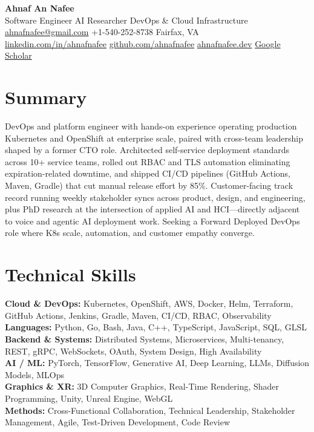 \documentclass[letterpaper,10pt]{article}
\begin{document}
\begin{center}
  {\LARGE\bfseries\color{accent} Ahnaf An Nafee }\\[3pt]
  {\normalsize Software Engineer \textbar{} AI Researcher \textbar{} DevOps \& Cloud Infrastructure }\\[4pt]
  \small
  \href{mailto:ahnafnafee@gmail.com}{ahnafnafee@gmail.com} \textbar{}
  +1-540-252-8738 \textbar{}
  Fairfax, VA\\
  \href{https://linkedin.com/in/ahnafnafee}{linkedin.com/in/ahnafnafee} \textbar{}
  \href{https://github.com/ahnafnafee}{github.com/ahnafnafee} \textbar{}
  \href{https://www.ahnafnafee.dev}{ahnafnafee.dev} \textbar{} \href{https://scholar.google.com/citations?user=u15DO0cAAAAJ}{Google Scholar}
\end{center}

\section*{Summary}
DevOps and platform engineer with hands-on experience operating production Kubernetes and OpenShift at enterprise scale, paired with cross-team leadership shaped by a former CTO role. Architected self-service deployment standards across 10+ service teams, rolled out RBAC and TLS automation eliminating expiration-related downtime, and shipped CI/CD pipelines (GitHub Actions, Maven, Gradle) that cut manual release effort by 85\%. Customer-facing track record running weekly stakeholder syncs across product, design, and engineering, plus PhD research at the intersection of applied AI and HCI---directly adjacent to voice and agentic AI deployment work. Seeking a Forward Deployed DevOps role where K8s scale, automation, and customer empathy converge.

\section*{Technical Skills}
\textbf{Cloud \& DevOps:} Kubernetes, OpenShift, AWS, Docker, Helm, Terraform, GitHub Actions, Jenkins, Gradle, Maven, CI/CD, RBAC, Observability\\
\textbf{Languages:} Python, Go, Bash, Java, C++, TypeScript, JavaScript, SQL, GLSL\\
\textbf{Backend \& Systems:} Distributed Systems, Microservices, Multi-tenancy, REST, gRPC, WebSockets, OAuth, System Design, High Availability\\
\textbf{AI / ML:} PyTorch, TensorFlow, Generative AI, Deep Learning, LLMs, Diffusion Models, MLOps\\
\textbf{Graphics \& XR:} 3D Computer Graphics, Real-Time Rendering, Shader Programming, Unity, Unreal Engine, WebGL\\
\textbf{Methods:} Cross-Functional Collaboration, Technical Leadership, Stakeholder Management, Agile, Test-Driven Development, Code Review
\end{document}
